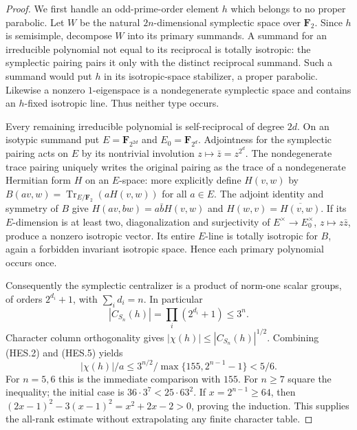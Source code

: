 \begin{proof}
We first handle an odd-prime-order element $h$ which belongs to no proper
parabolic. Let $W$ be the natural $2n$-dimensional symplectic space over
$\mathbf F_2$. Since $h$ is semisimple, decompose $W$ into its primary
summands. A summand for an irreducible polynomial not equal to its reciprocal
is totally isotropic: the symplectic pairing pairs it only with the distinct
reciprocal summand. Such a summand would put $h$ in its isotropic-space
stabilizer, a proper parabolic. Likewise a nonzero $1$-eigenspace is a
nondegenerate symplectic space and contains an $h$-fixed isotropic line.
Thus neither type occurs.

Every remaining irreducible polynomial is self-reciprocal of degree $2d$.
On an isotypic summand put $E=\mathbf F_{2^{2d}}$ and
$E_0=\mathbf F_{2^d}$. Adjointness for the symplectic pairing acts on $E$
by its nontrivial involution $z\mapsto\bar z=z^{2^d}$. The nondegenerate
trace pairing uniquely writes the original pairing as the trace of a
nondegenerate Hermitian form $H$ on an $E$-space: more explicitly define
$H(v,w)$ by $B(av,w)=\operatorname{Tr}_{E/\mathbf F_2}(aH(v,w))$ for all
$a\in E$. The adjoint identity and symmetry of $B$ give
$H(av,bw)=a\bar bH(v,w)$ and $H(w,v)=\overline{H(v,w)}$.
If its $E$-dimension is at least two, diagonalization and surjectivity of
$E^\times\to E_0^\times$, $z\mapsto z\bar z$, produce a nonzero isotropic
vector. Its entire $E$-line is totally isotropic for $B$, again a forbidden
invariant isotropic space. Hence each primary polynomial occurs once.

Consequently the symplectic centralizer is a product of norm-one scalar
groups, of orders $2^{d_i}+1$, with $\sum_i d_i=n$. In particular
\[
                  |C_{S_n}(h)|=\prod_i(2^{d_i}+1)\le3^n.
\tag{HES.5}
\]
Character column orthogonality gives
$|\chi(h)|\le|C_{S_n}(h)|^{1/2}$. Combining (HES.2) and (HES.5) yields
\[
       |\chi(h)|/a\le 3^{n/2}/\max\{155,2^{n-1}-1\}<5/6.
\tag{HES.6}
\]
For $n=5,6$ this is the immediate comparison with $155$. For $n\ge7$ square
the inequality; the initial case is
$36\cdot3^7<25\cdot63^2$. If $x=2^{n-1}\ge64$, then
$(2x-1)^2-3(x-1)^2=x^2+2x-2>0$, proving the induction. This supplies
the all-rank estimate without extrapolating any finite character table.


\end{proof}
